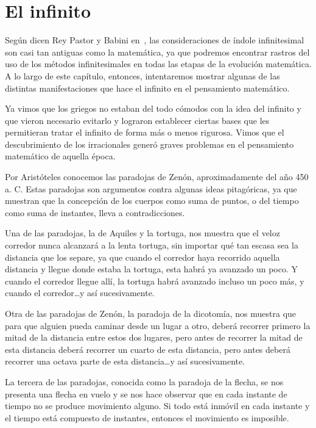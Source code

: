\chapter{El infinito}

Según dicen Rey Pastor y Babini en~\cite{BabiniReyPastor2}, las consideraciones
de índole infinitesimal son casi tan antiguas como la matemática, ya que
podremos encontrar rastros del uso de los métodos infinitesimales en todas las
etapas de la evolución matemática. A lo largo de este capítulo, entonces,
intentaremos mostrar algunas de las distintas manifestaciones que hace el
infinito en el pensamiento matemático.

Ya vimos que los griegos no estaban del todo cómodos con la idea del infinito y
que vieron necesario evitarlo y lograron establecer ciertas bases que les
permitieran tratar el infinito de forma más o menos rigurosa. Vimos que el
descubrimiento de los irracionales generó graves problemas en el pensamiento
matemático de aquella época. 

Por Aristóteles conocemos las paradojas de Zenón, aproximadamente del año 450
a.  C. Estas paradojas son argumentos contra algunas ideas pitagóricas, ya que
muestran que la concepción de los cuerpos como suma de puntos, o del tiempo
como suma de instantes, lleva a contradicciones. 

Una de las paradojas, la de Aquiles y la tortuga, nos muestra que el veloz
corredor nunca alcanzará a la lenta tortuga, sin importar qué tan escasa sea la
distancia que los separe, ya que cuando el corredor haya recorrido aquella
distancia y llegue donde estaba la tortuga, esta habrá ya avanzado un poco. Y
cuando el corredor llegue allí, la tortuga habrá avanzado incluso un poco más,
y cuando el corredor\dots y así sucesivamente. 

Otra de las paradojas de Zenón, la paradoja de la dicotomía, nos muestra que
para que alguien pueda caminar desde un lugar a otro, deberá recorrer primero
la mitad de la distancia entre estos dos lugares, pero antes de recorrer la
mitad de esta distancia deberá recorrer un cuarto de esta distancia, pero antes
deberá recorrer una octava parte de esta distancia\dots y así sucesivamente. 

La tercera de las paradojas, conocida como la paradoja de la flecha, se nos
presenta una flecha en vuelo y se nos hace observar que en cada instante de
tiempo no se produce movimiento alguno. Si todo está inmóvil en cada instante y
el tiempo está compuesto de instantes, entonces el movimiento es imposible. 

